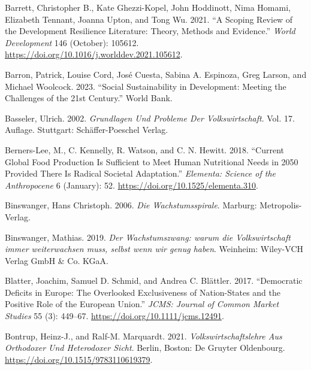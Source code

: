 \documentclass[
  a4paper,
  openany]{book}
\newlength{\cslhangindent}
\newenvironment{CSLReferences}[2] %
 {\begin{list}{}{%
  \setlength{\itemindent}{0pt}
  \setlength{\leftmargin}{0pt}
  \setlength{\parsep}{0pt}
  \ifodd #1
   \setlength{\leftmargin}{\cslhangindent}
   \setlength{\itemindent}{-1\cslhangindent}
  \fi
  \setlength{\itemsep}{#2\baselineskip}}}
 {\end{list}}
\begin{document}
\begin{CSLReferences}{1}{0}
Barrett, Christopher B., Kate Ghezzi-Kopel, John Hoddinott, Nima Homami,
Elizabeth Tennant, Joanna Upton, and Tong Wu. 2021. {``A Scoping Review
of the Development Resilience Literature: {Theory}, Methods and
Evidence.''} \emph{World Development} 146 (October): 105612.
\url{https://doi.org/10.1016/j.worlddev.2021.105612}.

Barron, Patrick, Louise Cord, José Cuesta, Sabina A. Espinoza, Greg
Larson, and Michael Woolcock. 2023. {``Social {Sustainability} in
{Development}: {Meeting} the {Challenges} of the 21st {Century}.''}
World Bank.

Basseler, Ulrich. 2002. \emph{Grundlagen Und {Probleme} Der
{Volkswirtschaft}}. Vol. 17. Auflage. Stuttgart: Sch{ä}ffer-Poeschel
Verlag.

Berners-Lee, M., C. Kennelly, R. Watson, and C. N. Hewitt. 2018.
{``Current Global Food Production Is Sufficient to Meet Human
Nutritional Needs in 2050 Provided There Is Radical Societal
Adaptation.''} \emph{Elementa: Science of the Anthropocene} 6 (January):
52. \url{https://doi.org/10.1525/elementa.310}.

Binswanger, Hans Christoph. 2006. \emph{Die {Wachstumsspirale}}.
Marburg: Metropolis-Verlag.

Binswanger, Mathias. 2019. \emph{{Der Wachstumszwang: warum die
Volkswirtschaft immer weiterwachsen muss, selbst wenn wir genug haben}}.
Weinheim: Wiley-VCH Verlag GmbH \& Co. KGaA.

Blatter, Joachim, Samuel D. Schmid, and Andrea C. Blättler. 2017.
{``Democratic {Deficits} in {Europe}: {The Overlooked Exclusiveness} of
{Nation-States} and the {Positive Role} of the {European Union}.''}
\emph{JCMS: Journal of Common Market Studies} 55 (3): 449--67.
\url{https://doi.org/10.1111/jcms.12491}.

Bontrup, Heinz-J., and Ralf-M. Marquardt. 2021.
\emph{Volkswirtschaftslehre Aus Orthodoxer Und Heterodoxer {Sicht}}.
Berlin, Boston: De Gruyter Oldenbourg.
\url{https://doi.org/10.1515/9783110619379}.


\end{CSLReferences}
\end{document}
